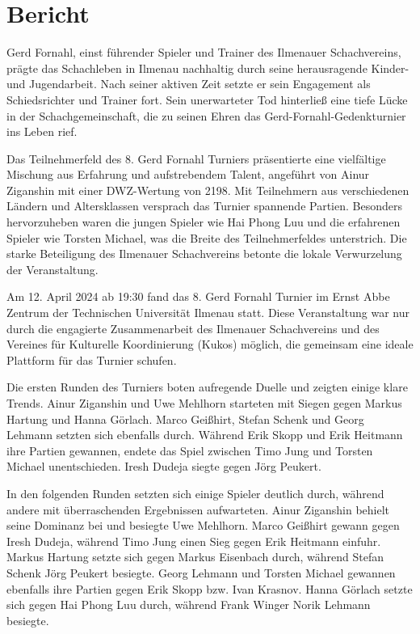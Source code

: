 \documentclass[a4paper,ngerman]{tui-algo-seminar}
\begin{document}
\section{Bericht}
\setlength{\parindent}{0pt}
Gerd Fornahl, einst führender Spieler und Trainer des Ilmenauer Schachvereins, prägte das Schachleben in Ilmenau nachhaltig durch seine herausragende Kinder- und Jugendarbeit. Nach seiner aktiven Zeit setzte er sein Engagement als Schiedsrichter und Trainer fort. Sein unerwarteter Tod hinterließ eine tiefe Lücke in der Schachgemeinschaft, die zu seinen Ehren das Gerd-Fornahl-Gedenkturnier ins Leben rief. ~\cite{fornahl2} ~\cite{fornahl1}

Das Teilnehmerfeld des 8. Gerd Fornahl Turniers präsentierte eine vielfältige Mischung aus Erfahrung und aufstrebendem Talent, angeführt von Ainur Ziganshin mit einer DWZ-Wertung von 2198. Mit Teilnehmern aus verschiedenen Ländern und Altersklassen versprach das Turnier spannende Partien. Besonders hervorzuheben waren die jungen Spieler wie Hai Phong Luu und die erfahrenen Spieler wie Torsten Michael, was die Breite des Teilnehmerfeldes unterstrich. Die starke Beteiligung des Ilmenauer Schachvereins betonte die lokale Verwurzelung der Veranstaltung.

Am 12. April 2024 ab 19:30 fand das 8. Gerd Fornahl Turnier im Ernst Abbe Zentrum der Technischen Universität Ilmenau statt. Diese Veranstaltung war nur durch die engagierte Zusammenarbeit des Ilmenauer Schachvereins und des Vereines für Kulturelle Koordinierung (Kukos) möglich, die gemeinsam eine ideale Plattform für das Turnier schufen.

Die ersten Runden des Turniers boten aufregende Duelle und zeigten einige klare Trends. Ainur Ziganshin und Uwe Mehlhorn starteten mit Siegen gegen Markus Hartung und Hanna Görlach. Marco Geißhirt, Stefan Schenk und Georg Lehmann setzten sich ebenfalls durch. Während Erik Skopp und Erik Heitmann ihre Partien gewannen, endete das Spiel zwischen Timo Jung und Torsten Michael unentschieden. Iresh Dudeja siegte gegen Jörg Peukert.

In den folgenden Runden setzten sich einige Spieler deutlich durch, während andere mit überraschenden Ergebnissen aufwarteten. Ainur Ziganshin behielt seine Dominanz bei und besiegte Uwe Mehlhorn. Marco Geißhirt gewann gegen Iresh Dudeja, während Timo Jung einen Sieg gegen Erik Heitmann einfuhr. Markus Hartung setzte sich gegen Markus Eisenbach durch, während Stefan Schenk Jörg Peukert besiegte. Georg Lehmann und Torsten Michael gewannen ebenfalls ihre Partien gegen Erik Skopp bzw. Ivan Krasnov. Hanna Görlach setzte sich gegen Hai Phong Luu durch, während Frank Winger Norik Lehmann besiegte.
\end{document}

